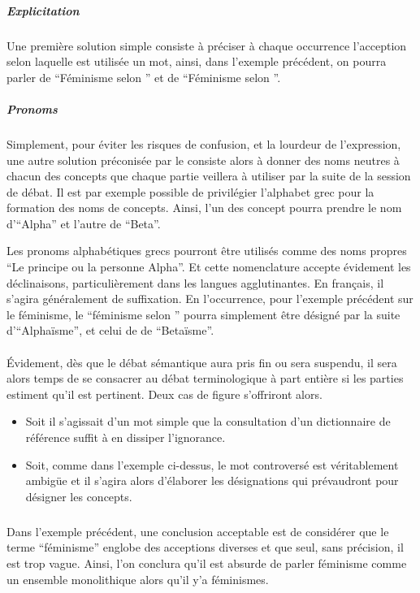 \paragraph{}
\subparagraph{Explicitation}
Une première solution simple consiste à préciser à chaque occurrence l’acception selon laquelle est utilisée un mot, ainsi, dans l’exemple précédent, on pourra parler de \enquote{Féminisme selon \A} et de \enquote{Féminisme selon \B}.

\subparagraph{Pronoms}
Simplement, pour éviter les risques de confusion, et la lourdeur de l’expression, une autre solution préconisée par le \mainabbr{} consiste alors à donner des noms neutres à chacun des concepts que chaque partie veillera à utiliser par la suite de la session de débat. Il est par exemple possible de privilégier l’alphabet grec pour la formation des noms de concepts. Ainsi, l’un des concept pourra prendre le nom d’\enquote{Alpha} et l’autre de \enquote{Beta}.

Les pronoms alphabétiques grecs pourront être utilisés comme des noms propres \enquote{Le principe ou la personne Alpha}. Et cette nomenclature accepte évidement les déclinaisons, particulièrement dans les langues agglutinantes. En français, il s’agira généralement de suffixation. En l’occurrence, pour l’exemple précédent sur le féminisme, le \enquote{féminisme selon \A} pourra simplement être désigné par la suite d’\enquote{Alphaïsme}, et celui de \B de \enquote{Betaïsme}.

\paragraph{}
Évidement, dès que le débat sémantique aura pris fin ou sera suspendu, il sera alors temps de se consacrer au débat terminologique à part entière si les parties estiment qu’il est pertinent. Deux cas de figure s’offriront alors.
\begin{itemize}
  \item Soit il s’agissait d’un mot simple que la consultation d’un dictionnaire de référence suffit à en dissiper l’ignorance.

  \item Soit, comme dans l’exemple ci-dessus, le mot controversé est véritablement ambigüe et il s’agira alors d’élaborer les désignations qui prévaudront pour désigner les concepts.
\end{itemize}

\subparagraph{}
Dans l’exemple précédent, une conclusion acceptable est de considérer que le terme \enquote{féminisme} englobe des acceptions diverses et que seul, sans précision, il est trop vague. Ainsi, l’on conclura qu’il est absurde de parler  féminisme comme un ensemble monolithique alors qu’il y’a  féminismes.


